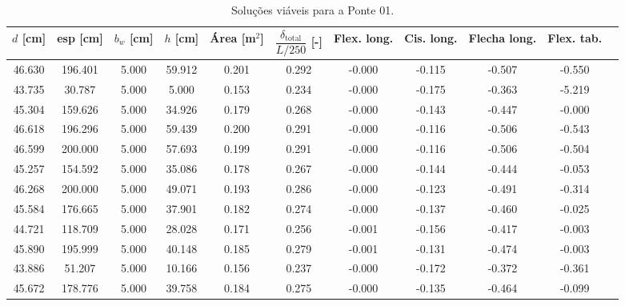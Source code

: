 \begin{table}[htpb!]
    \centering

    \caption{Soluções viáveis para a Ponte 01.}
    \label{tab:solucoesviaveis}

    \fontsize{11pt}{11pt}\selectfont
    \setlength{\tabcolsep}{2pt}
    \begin{tabular}{ccccccccccc}
        \toprule
        \textbf{$d$ [cm]} &
        \textbf{esp [cm]} &
        \textbf{$b_w$ [cm]} &
        \textbf{$h$ [cm]} &
        \textbf{Área [m$^2$]} &
        \textbf{$\dfrac{\delta_{\text{total}}}{L/250}$ [-]} &
        \textbf{Flex. long.} &
        \textbf{Cis. long.} &
        \textbf{Flecha long.} &
        \textbf{Flex. tab.} \\
        \midrule
        46.630 & 196.401 & 5.000 & 59.912 & 0.201 & 0.292 & -0.000 & -0.115 & -0.507 & -0.550 \\
        43.735 & 30.787 & 5.000 & 5.000 & 0.153 & 0.234 & -0.000 & -0.175 & -0.363 & -5.219 \\
        45.304 & 159.626 & 5.000 & 34.926 & 0.179 & 0.268 & -0.000 & -0.143 & -0.447 & -0.000 \\
        46.618 & 196.296 & 5.000 & 59.439 & 0.200 & 0.291 & -0.000 & -0.116 & -0.506 & -0.543 \\
        46.599 & 200.000 & 5.000 & 57.693 & 0.199 & 0.291 & -0.000 & -0.116 & -0.506 & -0.504 \\
        45.257 & 154.592 & 5.000 & 35.086 & 0.178 & 0.267 & -0.000 & -0.144 & -0.444 & -0.053 \\
        46.268 & 200.000 & 5.000 & 49.071 & 0.193 & 0.286 & -0.000 & -0.123 & -0.491 & -0.314 \\
        45.584 & 176.665 & 5.000 & 37.901 & 0.182 & 0.274 & -0.000 & -0.137 & -0.460 & -0.025 \\
        44.721 & 118.709 & 5.000 & 28.028 & 0.171 & 0.256 & -0.001 & -0.156 & -0.417 & -0.003 \\
        45.890 & 195.999 & 5.000 & 40.148 & 0.185 & 0.279 & -0.001 & -0.131 & -0.474 & -0.003 \\
        43.886 & 51.207 & 5.000 & 10.166 & 0.156 & 0.237 & -0.000 & -0.172 & -0.372 & -0.361 \\
        45.672 & 178.776 & 5.000 & 39.758 & 0.184 & 0.275 & -0.000 & -0.135 & -0.464 & -0.099 \\

\end{tabular}
\end{table}
